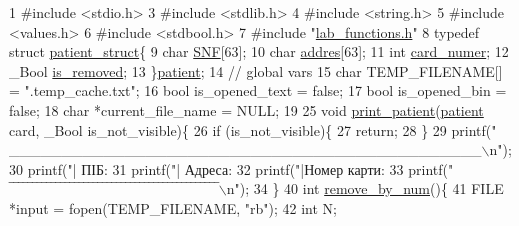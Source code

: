 \begin{DoxyCodeInclude}
1 \textcolor{preprocessor}{#include <stdio.h>}
3 \textcolor{preprocessor}{#include <stdlib.h>}
4 \textcolor{preprocessor}{#include <string.h>}
5 \textcolor{preprocessor}{#include <values.h>}
6 \textcolor{preprocessor}{#include <stdbool.h>}
7 \textcolor{preprocessor}{#include "\hyperlink{lab__functions_8h}{lab\_functions.h}"}
8 \textcolor{keyword}{typedef} \textcolor{keyword}{struct }\hyperlink{structpatient__struct}{patient\_struct}\{
9     \textcolor{keywordtype}{char} \hyperlink{structpatient__struct_a1748953b20361f0e24b467da0ef4a41c}{SNF}[63];
10     \textcolor{keywordtype}{char} \hyperlink{structpatient__struct_a74e029a3ea6a1d9896abb9477f53dcf8}{addres}[63];
11     \textcolor{keywordtype}{int} \hyperlink{structpatient__struct_a06e0e04046e9434904f4e53bb8583332}{card\_numer};
12     \_Bool \hyperlink{structpatient__struct_ad2475b69abfa9243c2700d63b63aa79b}{is\_removed};
13 \}\hyperlink{structpatient__struct}{patient};
14 \textcolor{comment}{// global vars}
15 \textcolor{keywordtype}{char} TEMP\_FILENAME[] = \textcolor{stringliteral}{".temp\_cache.txt"};
16 \textcolor{keywordtype}{bool} is\_opened\_text = \textcolor{keyword}{false};
17 \textcolor{keywordtype}{bool} is\_opened\_bin = \textcolor{keyword}{false};
18 \textcolor{keywordtype}{char} *current\_file\_name = NULL;
19 
25 \textcolor{keywordtype}{void} \hyperlink{main_8c_abbf86d13b1ad7b2b758cea501fa0261a}{print\_patient}(\hyperlink{structpatient__struct}{patient} card, \_Bool is\_not\_visible)\{
26     \textcolor{keywordflow}{if} (is\_not\_visible)\{
27         \textcolor{keywordflow}{return};
28     \}
29     printf(\textcolor{stringliteral}{" \_\_\_\_\_\_\_\_\_\_\_\_\_\_\_\_\_\_\_\_\_\_\_\_\_\_\_\_\_\_\_\_\_\_\_\_\_\_\_\_\_\_\_\_\_\(\backslash\)n"});
30     printf(\textcolor{stringliteral}{"|        ПІБ: %
31     printf(\textcolor{stringliteral}{"|     Адреса: %
32     printf(\textcolor{stringliteral}{"|Номер карти: %
33     printf(\textcolor{stringliteral}{" ‾‾‾‾‾‾‾‾‾‾‾‾‾‾‾‾‾‾‾‾‾‾‾‾‾‾‾‾‾‾‾‾‾‾‾‾‾‾‾‾‾‾‾‾‾\(\backslash\)n"});
34 \}
40 \textcolor{keywordtype}{int} \hyperlink{main_8c_a3d170322fbad052da4a3999178a2f5ea}{remove\_by\_num}()\{
41     FILE *input = fopen(TEMP\_FILENAME, \textcolor{stringliteral}{"rb"});
42     \textcolor{keywordtype}{int} N;
}}}
\end{DoxyCodeInclude}
